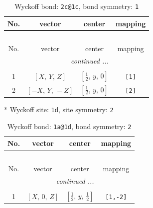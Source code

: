 \documentclass[fleqn,8pt]{jsarticle}
\begin{document}
\renewcommand{\arraystretch}{1.2}
\begin{longtable}{cccc}
\caption{Wyckoff bond: {\tt 2c@1c}, bond symmetry: {\tt 1}}
 \\
 \hline \hline
No. & vector & center & mapping \\ \hline \endfirsthead

\multicolumn{3}{l}{\tablename\ \thetable{}} \\
 \hline \hline
No. & vector & center & mapping \\ \hline \endhead

 \hline \hline
\multicolumn{3}{r}{\footnotesize\it continued ...} \\ \endfoot

 \hline \hline
\multicolumn{3}{r}{} \\ \endlastfoot

1 & $\left[ X,\, Y,\, Z \right]$ & $\left[ \frac{1}{2},\, y,\, 0 \right]$ & {\tt [1]} \\ \hline
2 & $\left[ - X,\, Y,\, - Z \right]$ & $\left[ \frac{1}{2},\, y,\, 0 \right]$ & {\tt [2]} \\
\end{longtable}
* Wyckoff site: {\tt 1d}, site symmetry: {\tt 2}
\renewcommand{\arraystretch}{1.2}
\begin{longtable}{cccc}
\caption{Wyckoff bond: {\tt 1a@1d}, bond symmetry: {\tt 2}}
 \\
 \hline \hline
No. & vector & center & mapping \\ \hline \endfirsthead

\multicolumn{3}{l}{\tablename\ \thetable{}} \\
 \hline \hline
No. & vector & center & mapping \\ \hline \endhead

 \hline \hline
\multicolumn{3}{r}{\footnotesize\it continued ...} \\ \endfoot

 \hline \hline
\multicolumn{3}{r}{} \\ \endlastfoot

1 & $\left[ X,\, 0,\, Z \right]$ & $\left[ \frac{1}{2},\, y,\, \frac{1}{2} \right]$ & {\tt [1,-2]} \\
\end{longtable}
\renewcommand{\arraystretch}{1.2}
\end{document}
